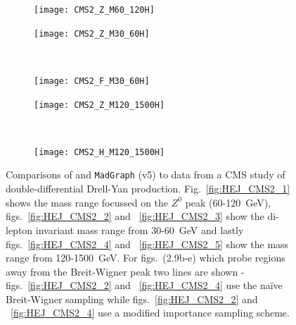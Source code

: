 	\begin{figure}[h]
		\centering
		\begin{subfigure}[b]{0.75\textwidth}
		  \texttt{[image: CMS2\_Z\_M60\_120H]}
		  \caption{}
		  \label{fig:HEJ_CMS2_1}
		\end{subfigure}
	\end{figure}
	\begin{figure}[h]
		\ContinuedFloat
		\label{fig:HEJ_CMS2}
		\begin{subfigure}[b]{0.47\textwidth}
		  \texttt{[image: CMS2\_Z\_M30\_60H]}
		  \caption{}
		  \label{fig:HEJ_CMS2_2}
		\end{subfigure}
		~
		\begin{subfigure}[b]{0.47\textwidth}
		  \texttt{[image: CMS2\_F\_M30\_60H]}
		  \caption{}
		  \label{fig:HEJ_CMS2_3}
		\end{subfigure}

		\begin{subfigure}[b]{0.47\textwidth}
		  \texttt{[image: CMS2\_Z\_M120\_1500H]}
		  \caption{}
		  \label{fig:HEJ_CMS2_4}
		\end{subfigure}
		~
		\begin{subfigure}[b]{0.47\textwidth}
		  \texttt{[image: CMS2\_H\_M120\_1500H]}
		  \caption{}
		  \label{fig:HEJ_CMS2_5}
		\end{subfigure}
		\caption{Comparisons of \HEJ and \texttt{MadGraph} (v5) to data from a CMS study of double-differential
		Drell-Yan production.  Fig.~\eqref{fig:HEJ_CMS2_1} shows the mass range focussed on the $Z^0$ peak
		(60-120~GeV), figs.~\eqref{fig:HEJ_CMS2_2} and ~\eqref{fig:HEJ_CMS2_3} show the di-lepton invariant
		mass range from 30-60~GeV and lastly figs.~\eqref{fig:HEJ_CMS2_4} and ~\eqref{fig:HEJ_CMS2_5} show
		the mass range from 120-1500~GeV.  For figs.~(2.9b-e) which probe regions away from the Breit-Wigner peak
		two \HEJ lines are shown - figs.~\eqref{fig:HEJ_CMS2_2} and ~\eqref{fig:HEJ_CMS2_4} use the
		na\"ive Breit-Wigner sampling while figs.~\eqref{fig:HEJ_CMS2_2} and ~\eqref{fig:HEJ_CMS2_4}
		use a modified importance sampling scheme.}
	\end{figure}

